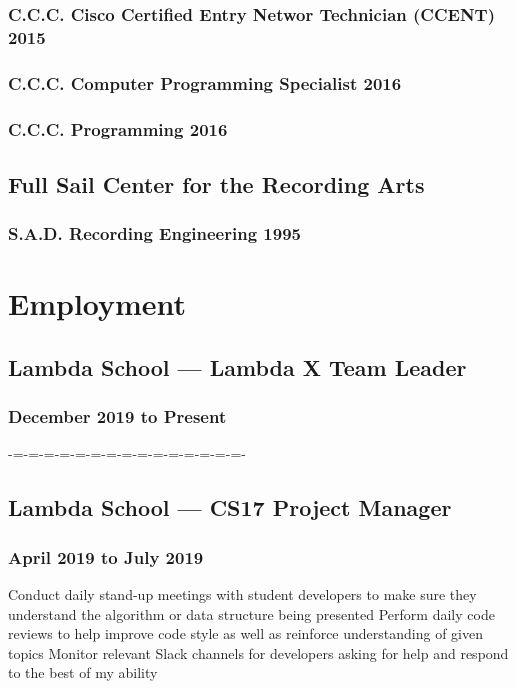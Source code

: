 \documentclass{article}
\begin{document}
\subsubsection{C.C.C. Cisco Certified Entry Networ Technician (CCENT) 2015}
\subsubsection{C.C.C. Computer Programming Specialist 2016}
\subsubsection{C.C.C. Programming 2016}

\subsection{Full Sail Center for the Recording Arts}
\subsubsection{S.A.D. Recording Engineering 1995}



\section{Employment}
\subsection{Lambda School --- Lambda X Team Leader}
\subsubsection{December 2019 to Present}
-=-=-=-=-=-=-=-=-=-=-=-=-=-=-=-

\subsection{Lambda School --- CS17 Project Manager}
\subsubsection{April 2019 to July 2019}
Conduct daily stand-up meetings with student developers to make sure they understand the algorithm or data structure being presented
Perform daily code reviews to help improve code style as well as reinforce understanding of given topics
Monitor relevant Slack channels for developers asking for help and respond to the best of my ability
\end{document}
